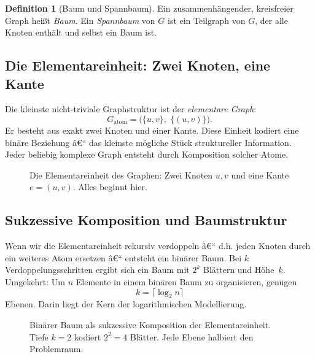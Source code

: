 ﻿\documentclass[12pt,a4paper,twoside]{article}
\theoremstyle{definition}
\newtheorem{definition}{Definition}[section]
\theoremstyle{plain}
\theoremstyle{remark}
\begin{document}
\begin{definition}[Baum und Spannbaum]
Ein zusammenhängender, kreisfreier Graph heißt \emph{Baum}.
Ein \emph{Spannbaum} von $G$ ist ein Teilgraph von $G$, der alle
Knoten enthält und selbst ein Baum ist.
\end{definition}

\subsection{Die Elementareinheit: Zwei Knoten, eine Kante}

Die kleinste nicht-triviale Graphstruktur ist der \emph{elementare
Graph}:
\[
  G_{\text{atom}} = \bigl(\{u, v\},\; \{(u,v)\}\bigr).
\]
Er besteht aus exakt zwei Knoten und einer Kante.  Diese Einheit
kodiert eine binäre Beziehung â€“ das kleinste mögliche Stück
struktureller Information.  Jeder beliebig komplexe Graph entsteht
durch Komposition solcher Atome.

\begin{figure}[h]
  \centering
  \caption{Die Elementareinheit des Graphen: Zwei Knoten $u, v$
           und eine Kante $e=(u,v)$.  Alles beginnt hier.}
  \label{fig:atom}
\end{figure}

\subsection{Sukzessive Komposition und Baumstruktur}

Wenn wir die Elementareinheit rekursiv verdoppeln â€“ d.h. jeden
Knoten durch ein weiteres Atom ersetzen â€“ entsteht ein binärer
Baum.  Bei $k$ Verdoppelungsschritten ergibt sich ein Baum mit
$2^k$ Blättern und Höhe~$k$.  Umgekehrt:  Um $n$ Elemente in
einem binären Baum zu organisieren, genügen
\[
  k = \lceil \log_2 n \rceil
\]
Ebenen.  Darin liegt der Kern der logarithmischen Modellierung.

\begin{figure}[h]
  \centering
  \caption{Binärer Baum als sukzessive Komposition der
           Elementareinheit.  Tiefe $k=2$ kodiert $2^2=4$ Blätter.
           Jede Ebene halbiert den Problemraum.}
  \label{fig:binaer}
\end{figure}
\end{document}
